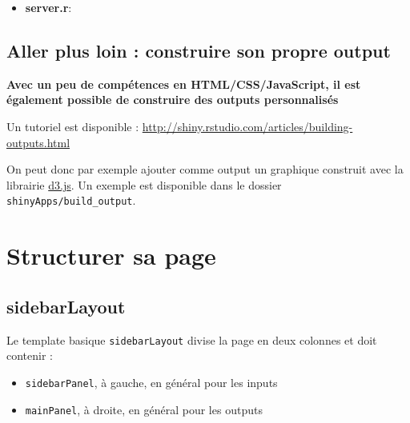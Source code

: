 \documentclass[]{article}
\newenvironment{Shaded}{\begin{snugshade}}{\end{snugshade}}
\newcommand{\KeywordTok}[1]{\textcolor[rgb]{0.13,0.29,0.53}{\textbf{#1}}}
\newcommand{\DataTypeTok}[1]{\textcolor[rgb]{0.13,0.29,0.53}{#1}}
\newcommand{\DecValTok}[1]{\textcolor[rgb]{0.00,0.00,0.81}{#1}}
\newcommand{\StringTok}[1]{\textcolor[rgb]{0.31,0.60,0.02}{#1}}
\newcommand{\OperatorTok}[1]{\textcolor[rgb]{0.81,0.36,0.00}{\textbf{#1}}}
\newcommand{\NormalTok}[1]{#1}
\providecommand{\tightlist}{%
  \setlength{\itemsep}{0pt}\setlength{\parskip}{0pt}}
\begin{document}
\begin{itemize}
\tightlist
\item
  \textbf{server.r}:
\end{itemize}

\begin{Shaded}
\end{Shaded}

\subsection{Aller plus loin : construire son propre
output}\label{aller-plus-loin-construire-son-propre-output}

\textbf{Avec un peu de compétences en HTML/CSS/JavaScript, il est
également possible de construire des outputs personnalisés}

Un tutoriel est disponible :
\url{http://shiny.rstudio.com/articles/building-outputs.html}

On peut donc par exemple ajouter comme output un graphique construit
avec la librairie \href{https://d3js.org/}{d3.js}. Un exemple est
disponible dans le dossier \texttt{shinyApps/build\_output}.

\section{Structurer sa page}\label{structurer-sa-page}

\subsection{sidebarLayout}\label{sidebarlayout}

Le template basique \texttt{sidebarLayout} divise la page en deux
colonnes et doit contenir :

\begin{itemize}
\item
  \texttt{sidebarPanel}, à gauche, en général pour les inputs
\item
  \texttt{mainPanel}, à droite, en général pour les outputs
\end{itemize}
\end{document}

